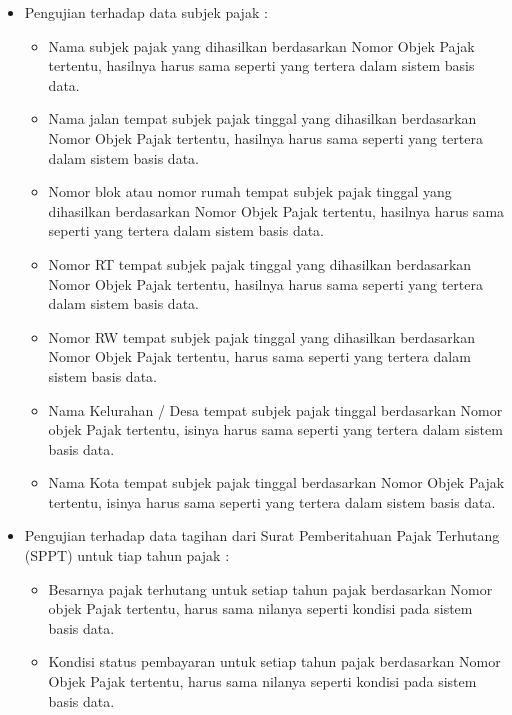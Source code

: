 \begin{itemize}
	\item Pengujian terhadap data subjek pajak :
	
	\begin{itemize}
		\item Nama subjek pajak yang dihasilkan berdasarkan Nomor Objek Pajak tertentu, hasilnya harus sama seperti yang tertera dalam sistem basis data.
		\item Nama jalan tempat subjek pajak tinggal yang dihasilkan berdasarkan Nomor Objek Pajak tertentu, hasilnya harus sama seperti yang tertera dalam sistem basis data.
		\item Nomor blok atau nomor rumah tempat subjek pajak tinggal yang dihasilkan berdasarkan Nomor Objek Pajak tertentu, hasilnya harus sama seperti yang tertera dalam sistem basis data.
		\item Nomor RT tempat subjek pajak tinggal yang dihasilkan berdasarkan Nomor Objek Pajak tertentu, hasilnya harus sama seperti yang tertera dalam sistem basis data.
		\item Nomor RW tempat subjek pajak tinggal yang dihasilkan berdasarkan Nomor Objek Pajak tertentu, harus sama seperti yang tertera dalam sistem basis data.
		\item Nama Kelurahan / Desa tempat subjek pajak tinggal berdasarkan Nomor objek Pajak tertentu, isinya harus sama seperti yang tertera dalam sistem basis data.
		\item Nama Kota tempat subjek pajak tinggal berdasarkan Nomor Objek Pajak tertentu, isinya harus sama seperti yang tertera dalam sistem basis data.
	\end{itemize}
	
	\item Pengujian terhadap data tagihan dari Surat Pemberitahuan Pajak Terhutang (SPPT) untuk tiap tahun pajak : 
	
	\begin{itemize}
		\item Besarnya pajak terhutang untuk setiap tahun pajak berdasarkan Nomor objek Pajak tertentu, harus sama nilanya seperti kondisi pada sistem basis data.
		\item Kondisi status pembayaran untuk setiap tahun pajak berdasarkan Nomor Objek Pajak tertentu, harus sama nilanya seperti kondisi pada sistem basis data.
	\end{itemize}
\end{itemize}